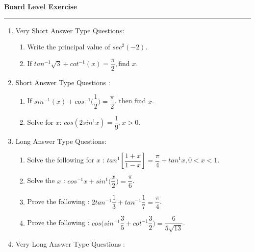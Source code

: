 \documentclass[a4paper,10pt]{article}
\begin{document}
\begin{center}
\Huge{\textbf {Board Level Exercise}}
\vspace{6mm}
\hrule
\end{center}
\vspace{5mm}
\begin{enumerate}[Type (I):]
\item Very Short Answer Type Questions:
\begin{enumerate}[1.]
\item Write the principal value of $sec^{2}(-2)$.
\vspace{5mm}
\item If \(tan^{-1}\sqrt{3}+cot^{-1}(x)=\dfrac{\pi}{2},\)find $x$.
\end{enumerate}
\item Short Answer Type Questions : 

\begin{enumerate}[1.]
\item If $sin^{-1}(x)+cos^{-1}\big(\dfrac{1}{2}\big)=\dfrac{\pi}{2}$. then find
$x$.
\vspace{5mm} 
\item Solve for $x$: $cos(2sin^1x)=\dfrac{1}{9}, x>0$.
\end{enumerate}
\item Long Answer Type Questions:

\begin{enumerate}[1.]
\item Solve the following for $x$ :
$tan^1\left[\dfrac{1+x}{1-x}\right]=\dfrac{\pi}{4}+tan^1x, 0<x<1$.
\vspace{5mm}
\item Solve the $x$ :
$cos^{-1}x+sin^1\big(\dfrac{x}{2}\big)=\dfrac{\pi}{6}$. 
\vspace{5mm}
\item Prove the following :
$2tan^{-1}\dfrac{1}{3}+tan^{-1}\dfrac{1}{7}=\dfrac{\pi}{4}$.
\vspace{5mm}
\item Prove the following :
$cos\Bigg(sin^{-1}\dfrac{3}{5}+cot^{-1}\dfrac{3}{2}\Bigg)=\dfrac{6}{5
\sqrt{13}}$.
\end{enumerate}
\item Very Long Answer Type Questions :


\end{enumerate}
\end{document}
